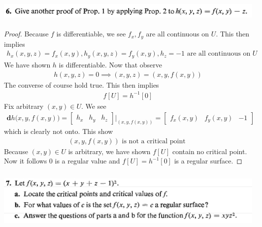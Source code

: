 \documentclass{report}
\begin{document}
\begin{question}{}{}
\includegraphics[height=1cm,width=18cm]{hw2q8}
\end{question}
\begin{proof}
Because $f$ is differentiable, we see $f_x,f_y$ are all continuous on $U$. This then implies 
 \begin{align*}
h_x(x,y,z)=f_x(x,y),h_y(x,y,z)=f_y(x,y),h_z=-1\text{ are all continuous on $U$ }
\end{align*}
We have shown $h$ is differentiable. Now that observe 
\begin{align*}
h(x,y,z)=0 \implies (x,y,z)=(x,y,f(x,y))
\end{align*}
The converse of course hold true. This then implies 
\begin{align*}
  f[U]=h^{-1}[0]
\end{align*}
Fix arbitrary $(x,y) \in U$. We see 
 \begin{align*}
\textbf{d}h\big(x,y,f(x,y) \big)=\begin{bmatrix} 
  h_x & h_y & h_z
\end{bmatrix}\Big|_{(x,y,f(x,y))}=\begin{bmatrix}
  f_x(x,y) & f_y(x,y) & -1 
\end{bmatrix}
\end{align*}
which is clearly not onto. This show 
\begin{align*}
  (x,y,f(x,y))\text{ is not a critical point }
\end{align*}
Because $(x,y) \in U $ is arbitrary, we have shown $f[U]$ contain no critical point. Now it follows $0$ is a regular value and $f[U]=h^{-1}[0]$ is a regular surface.
\end{proof}
\begin{question}{}{}
\includegraphics[height=3cm,width=18cm]{hw2q7}
\end{question}
\end{document}
